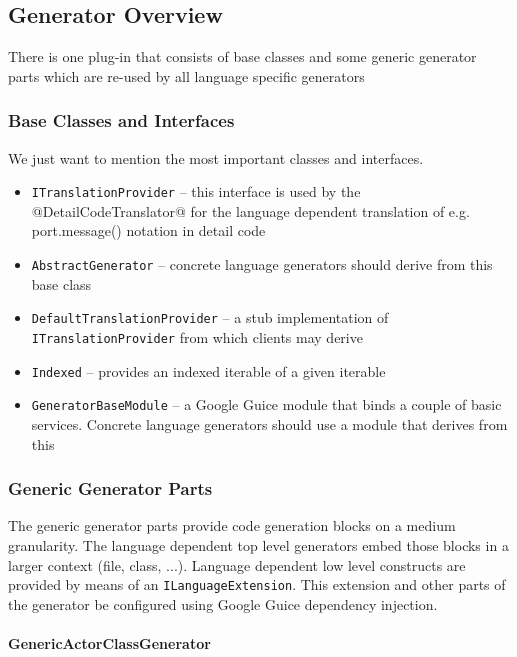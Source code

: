 \subsection{Generator Overview}

There is one plug-in that consists of base classes and some generic generator parts which are re-used by all language specific generators
 
\subsubsection{Base Classes and Interfaces}

We just want to mention the most important classes and interfaces.

\begin{itemize}
\item \texttt{ITranslationProvider} -- this interface is used by the @DetailCodeTranslator@ for the language dependent translation of e.g. port.message() notation in detail code
\item \texttt{AbstractGenerator} -- concrete language generators should derive from this base class
\item \texttt{DefaultTranslationProvider} -- a stub implementation of \texttt{ITranslationProvider} from which clients may derive
\item \texttt{Indexed} -- provides an indexed iterable of a given iterable
\item \texttt{GeneratorBaseModule} -- a Google Guice module that binds a couple of basic services. Concrete language generators should use a module that derives from this
\end{itemize}

\subsubsection{Generic Generator Parts}

The generic generator parts provide code generation blocks on a medium granularity. The language dependent top level generators embed those blocks in a larger context (file, class, ...). Language dependent low level constructs are provided by means of an \texttt{ILanguageExtension}. This extension and other parts of the generator be configured using Google Guice dependency injection.

\paragraph{GenericActorClassGenerator}

